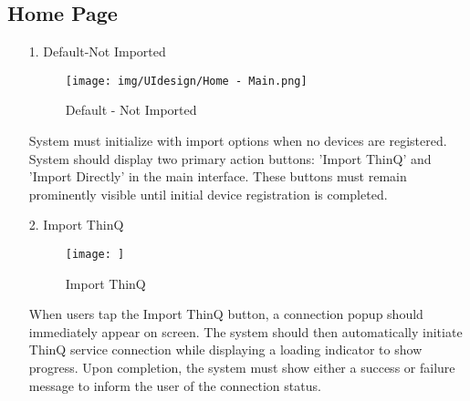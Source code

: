\documentclass[conference]{IEEEtran}
\begin{document}
\begin{enumerate}
\begin{itemize}
\begin{itemize}
\begin{enumerate}
    
    

\subsection{Home Page}

\begin{enumerate}
    \item[1.] Default-Not Imported
    \begin{figure}[h]
        {\centering
        \hspace{4cm}
        \begin{minipage}{0.4\columnwidth}
            \texttt{[image: img/UIdesign/Home - Main.png]}
            \caption{Default - Not Imported}
        \end{minipage}}
    \end{figure}
    
    System must initialize with import options when no devices are registered. System should display two primary action buttons: 'Import ThinQ' and 'Import Directly' in the main interface. These buttons must remain prominently visible until initial device registration is completed. \\ 
\end{enumerate}

\begin{enumerate}
    \item[2.] Import ThinQ
    \begin{figure}[h]
        {\centering
        \hspace{4cm}
        \begin{minipage}{0.4\columnwidth}
            \texttt{[image: ]}
            \caption{Import ThinQ}
        \end{minipage}}
    \end{figure}
    
    When users tap the Import ThinQ button, a connection popup should immediately appear on screen. The system should then automatically initiate ThinQ service connection while displaying a loading indicator to show progress. Upon completion, the system must show either a success or failure message to inform the user of the connection status. \\ \\ \\ \\ \\ \\ \\ \\ \\ \\ \\ \\ \\ \\ \\ \\
\end{enumerate}


\end{enumerate}
\end{itemize}
\end{itemize}
\end{enumerate}
\end{document}
